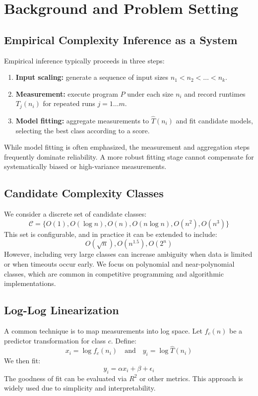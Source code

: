 \documentclass[conference]{IEEEtran}
\begin{document}
\section{Background and Problem Setting}
\label{sec:background}

\subsection{Empirical Complexity Inference as a System}

Empirical inference typically proceeds in three steps:
\begin{enumerate}[leftmargin=1.2em]
\item \textbf{Input scaling:} generate a sequence of input sizes
$n_1 < n_2 < \dots < n_k$.
\item \textbf{Measurement:} execute program $P$ under each size $n_i$ and record
runtimes $T_j(n_i)$ for repeated runs $j=1\dots m$.
\item \textbf{Model fitting:} aggregate measurements to $\hat{T}(n_i)$ and fit
candidate models, selecting the best class according to a score.
\end{enumerate}

While model fitting is often emphasized, the measurement and aggregation steps
frequently dominate reliability.
A more robust fitting stage cannot compensate for systematically biased or
high-variance measurements.

\subsection{Candidate Complexity Classes}

We consider a discrete set of candidate classes:
\[
\mathcal{C}
=
\{
O(1),
O(\log n),
O(n),
O(n \log n),
O(n^2),
O(n^3)
\}
\]
This set is configurable, and in practice it can be extended to include:
\[
O(\sqrt{n}),
O(n^{1.5}),
O(2^n)
\]
However, including very large classes can increase ambiguity when data is
limited or when timeouts occur early.
We focus on polynomial and near-polynomial classes, which are common in
competitive programming and algorithmic implementations.

\subsection{Log-Log Linearization}

A common technique is to map measurements into log space.
Let $f_c(n)$ be a predictor transformation for class $c$.
Define:
\[
x_i = \log f_c(n_i)
\quad
\text{and}
\quad
y_i = \log \hat{T}(n_i)
\]
We then fit:
\[
y_i = \alpha x_i + \beta + \epsilon_i
\]
The goodness of fit can be evaluated via $R^2$ or other metrics.
This approach is widely used due to simplicity and interpretability.
\end{document}
